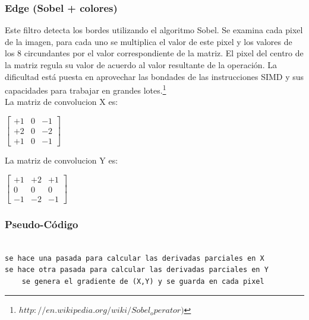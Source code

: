 \subsubsection{Edge (Sobel + colores)}

Este filtro detecta los bordes utilizando el algoritmo Sobel. Se examina cada pixel de la imagen, para cada uno se multiplica el valor de este pixel y los valores de los 8 circundantes por el valor correspondiente de la matriz. El pixel del centro de la matriz regula su valor de acuerdo al valor resultante de la operaci\'on. La dificultad est\'a puesta en aprovechar las bondades de las instrucciones SIMD y sus capacidades para trabajar en grandes lotes.\footnote{$http://en.wikipedia.org/wiki/Sobel_operator)$} \\
La matriz de convolucion X es:
\begin{center}
$\begin{bmatrix}
  +1 & 0 & -1 \\
  +2 & 0 & -2 \\
  +1 & 0 & -1
 \end{bmatrix}$
 \end{center}
La matriz de convolucion Y es:
\\
\begin{center}
$\begin{bmatrix}
  +1 & +2 & +1 \\
  0 & 0 & 0 \\
  -1 & -2 & -1
 \end{bmatrix}
$\end{center}

\subsubsection*{Pseudo-C\'odigo}
\begin{verbatim}

se hace una pasada para calcular las derivadas parciales en X
se hace otra pasada para calcular las derivadas parciales en Y
    se genera el gradiente de (X,Y) y se guarda en cada pixel
\end{verbatim}
